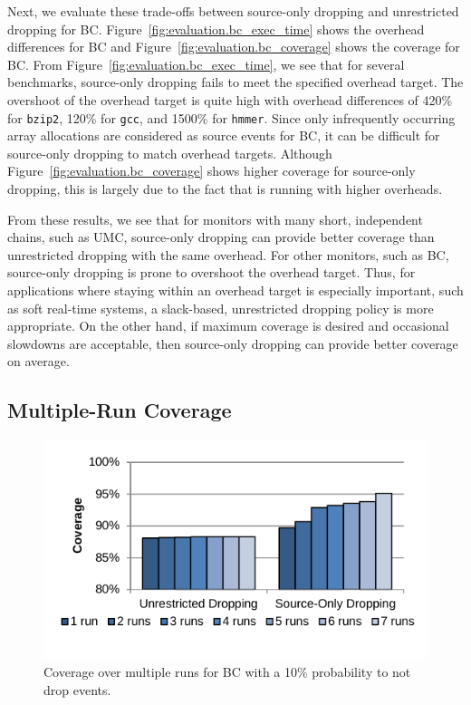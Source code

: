 Next, we evaluate these trade-offs between source-only dropping and unrestricted dropping for BC.
Figure~\ref{fig:evaluation.bc_exec_time} shows the overhead differences for BC
and Figure~\ref{fig:evaluation.bc_coverage} shows the coverage for BC.
From Figure~\ref{fig:evaluation.bc_exec_time}, we see that for several
benchmarks, source-only dropping fails to meet the specified overhead target.
The overshoot of the overhead target is quite high with overhead differences
of 420\% for {\tt bzip2}, 120\% for {\tt gcc}, and 1500\% for {\tt hmmer}.
Since only infrequently occurring array allocations are considered as source events for BC, it can be 
difficult for source-only dropping to match overhead targets. Although
Figure~\ref{fig:evaluation.bc_coverage} shows higher coverage for
source-only dropping, this is largely due to the fact that is running with
higher overheads.

From these results, we see that for monitors with many short, independent
chains, such as UMC, source-only dropping can provide better coverage than
unrestricted dropping with the same overhead. For other monitors, such as BC,
source-only dropping is prone to overshoot the overhead target.
Thus, for applications where staying within an overhead target is especially
important, such as soft real-time systems, a slack-based, unrestricted dropping
policy is more appropriate. On the other hand, if maximum coverage is desired
and occasional slowdowns are acceptable, then source-only dropping can provide
better coverage on average.

\subsection{Multiple-Run Coverage}

\begin{figure}
  \begin{center}
    \includegraphics[width=\columnwidth, clip=true, trim=0 0.3in 0 0.1in]{figs/data_multirun_coverage.pdf}
    \vspace{-0.1in}
    \caption{Coverage over multiple runs for BC with a 10\% probability to not drop events.}
    \label{fig:evaluation.multirun}
    \vspace{-0.1in}
  \end{center}
\end{figure}

